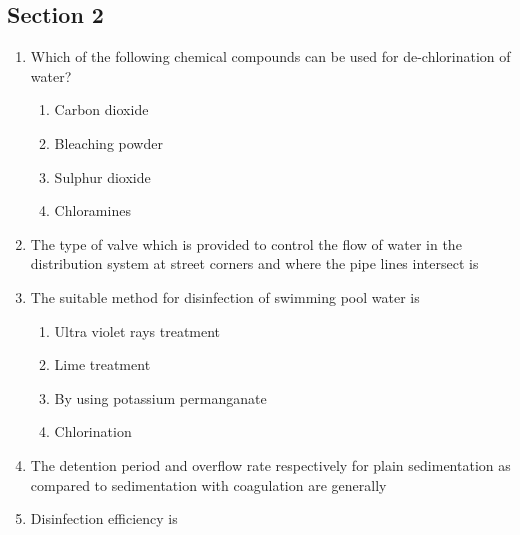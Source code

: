 \documentclass[11pt,a4paper]{article}
\begin{document}
\subsection*{Section 2}
\begin{enumerate}
\item{Which of the following chemical compounds can be used for de-chlorination of water?}
\begin{enumerate}[label=\Alph*.]
\item{Carbon dioxide}
\item{Bleaching powder}
\item{Sulphur dioxide}
\item{Chloramines}
\end{enumerate}
\item{The type of valve which is provided to control the flow of water in the distribution system at street corners and where the pipe lines intersect is}
\\
\item{The suitable method for disinfection of swimming pool water is}
\begin{enumerate}[label=\Alph*.]
\item{Ultra violet rays treatment}
\item{Lime treatment}
\item{By using potassium permanganate}
\item{Chlorination}
\end{enumerate}
\item{The detention period and overflow rate respectively for plain sedimentation as compared to sedimentation with coagulation are generally}
\\
\item{Disinfection efficiency is}
\begin{enumerate}[label=\Alph*.]

\end{enumerate}
\end{enumerate}
\end{document}
